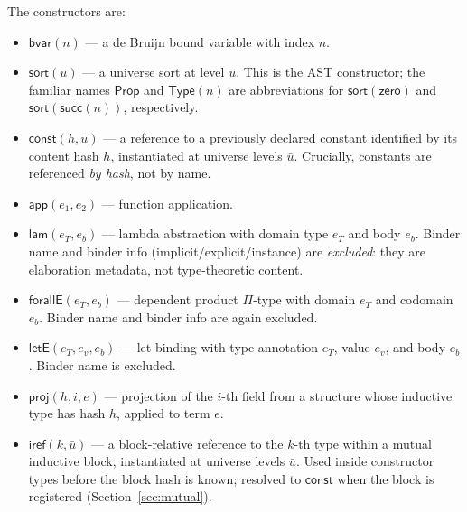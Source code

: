 \documentclass[11pt]{article}
\theoremstyle{definition}
\theoremstyle{plain}
\theoremstyle{remark}
\newcommand{\Prop}{\textsf{Prop}}
\newcommand{\Type}{\textsf{Type}}
\newcommand{\bvar}{\textsf{bvar}}
\newcommand{\const}{\textsf{const}}
\newcommand{\app}{\textsf{app}}
\newcommand{\lam}{\textsf{lam}}
\newcommand{\forallE}{\textsf{forallE}}
\newcommand{\letE}{\textsf{letE}}
\newcommand{\proj}{\textsf{proj}}
\newcommand{\sort}{\textsf{sort}}
\begin{document}
The constructors are:
\begin{itemize}[nosep]
  \item $\bvar(n)$ --- a de Bruijn bound variable with index $n$.
  \item $\sort(u)$ --- a universe sort at level $u$.
        This is the AST constructor; the familiar names $\Prop$ and $\Type(n)$ are
        abbreviations for $\sort(\textsf{zero})$ and $\sort(\textsf{succ}(n))$, respectively.
  \item $\const(h, \bar{u})$ --- a reference to a previously declared constant identified by its content hash $h$, instantiated at universe levels $\bar{u}$.
        Crucially, constants are referenced \emph{by hash}, not by name.
  \item $\app(e_1, e_2)$ --- function application.
  \item $\lam(e_T, e_b)$ --- lambda abstraction with domain type $e_T$ and body $e_b$.
        Binder name and binder info (implicit/explicit/instance) are \emph{excluded}: they are elaboration metadata, not type-theoretic content.
  \item $\forallE(e_T, e_b)$ --- dependent product $\Pi$-type with domain $e_T$ and codomain $e_b$.
        Binder name and binder info are again excluded.
  \item $\letE(e_T, e_v, e_b)$ --- let binding with type annotation $e_T$, value $e_v$, and body $e_b$.
        Binder name is excluded.
  \item $\proj(h, i, e)$ --- projection of the $i$-th field from a structure whose inductive type has hash $h$, applied to term $e$.
  \item $\textsf{iref}(k, \bar{u})$ --- a block-relative reference to the $k$-th type within a mutual inductive block, instantiated at universe levels $\bar{u}$.
        Used inside constructor types before the block hash is known; resolved to $\const$ when the block is registered (Section~\ref{sec:mutual}).
\end{itemize}
\end{document}
